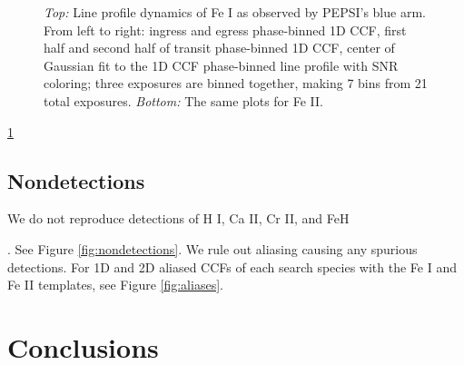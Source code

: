 \documentclass[twocolumn]{aastex631}
\begin{document}
            

        \begin{figure} \label{fig:phase-binned-1d-ccfs-Fe/Fe+}
            \centering
            \caption{\textit{Top:} Line profile dynamics of Fe I as observed by PEPSI's blue arm. From left to right: ingress and egress phase-binned 1D CCF, first half and second half of transit phase-binned 1D CCF, center of Gaussian fit to the 1D CCF phase-binned line profile with SNR coloring; three exposures are binned together, making 7 bins from 21 total exposures. \textit{Bottom:} The same plots for Fe II.}
        \end{figure}

        \ref{fig:phase-binned-1d-ccfs-Fe/Fe+}

                    
        \subsection{Nondetections}\label{subsec:Nondetections}
        
            We do not reproduce detections of H I, Ca II, Cr II, and FeH 
        
            \citep{CasasayasBarris2019, Nugroho2020, Hoeijmakers2020, Kesseli2020}. See Figure \ref{fig:nondetections}. We rule out aliasing causing any spurious detections. For 1D and 2D aliased CCFs of each search species with the Fe I and Fe II templates, see Figure \ref{fig:aliases}.




    \section{Conclusions}\label{sec:Conclusions}
\end{document}
